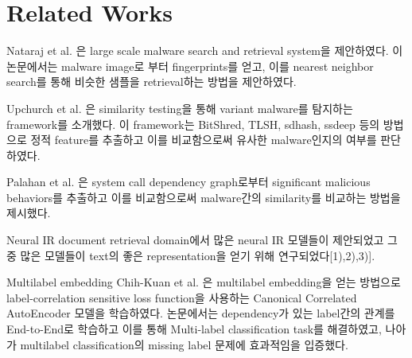 \section{Related Works}

Nataraj et al. 은 large scale malware search and retrieval system을 제안하였다. 이 논문에서는 malware image로 부터 fingerprints를 얻고, 이를 nearest neighbor search를 통해 비슷한 샘플을 retrieval하는 방법을 제안하였다. 

Upchurch et al. 은 similarity testing을 통해 variant malware를 탐지하는 framework를 소개했다. 이 framework는 BitShred, TLSH, sdhash, ssdeep 등의 방법으로 정적 feature를 추출하고 이를 비교함으로써 유사한 malware인지의 여부를 판단하였다.

Palahan et al. 은 system call dependency graph로부터 significant malicious behaviors를 추출하고 이를 비교함으로써 malware간의 similarity를 비교하는 방법을 제시했다. 

Neural IR
document retrieval domain에서 많은 neural IR 모델들이 제안되었고 그 중 많은 모델들이 text의 좋은 representation을 얻기 위해 연구되었다[1),2),3)]. 

Multilabel embedding
Chih-Kuan et al. 은 multilabel embedding을 얻는 방법으로 label-correlation sensitive loss function을 사용하는 Canonical Correlated AutoEncoder 모델을 학습하였다. 논문에서는 dependency가 있는 label간의 관계를 End-to-End로 학습하고 이를 통해 Multi-label classification task를 해결하였고, 나아가 multilabel classification의 missing label 문제에 효과적임을 입증했다.
